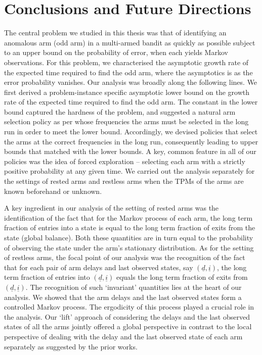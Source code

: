 \chapter{Conclusions and Future Directions}
\label{ch:conclusions_and_future_work}

The central problem we studied in this thesis was that of identifying an anomalous arm (odd arm) in a multi-armed bandit as quickly as possible subject to an upper bound on the probability of error, when each yields Markov observations. For this problem, we characterised the asymptotic growth rate of the expected time required to find the odd arm, where the asymptotics is as the error probability vanishes. Our analysis was broadly along the following lines. We first derived a problem-instance specific asymptotic lower bound on {\color{black} the growth rate of} the expected time required to find the odd arm. The constant in the lower bound captured the hardness of the problem, and suggested a natural arm selection policy as per whose frequencies the arms must be selected in the long run in order to meet the lower bound. Accordingly, we devised policies that select the arms at the correct frequencies in the long run, consequently leading to upper bounds that matched with the lower bounds. A key, common feature in all of our policies was the idea of forced exploration -- selecting each arm with a strictly positive probability at any given time. We carried out the analysis separately for the settings of rested arms and restless arms when the TPMs of the arms are known beforehand or unknown.

A key ingredient in our analysis of the setting of rested arms was the identification of the fact that for the Markov process of each arm, the long term fraction of entries into a state is equal to the long term fraction of exits from the state (global balance). Both these quantities are in turn equal to the probability of observing the state under the arm's stationary distribution. As for the setting of restless arms, the focal point of our analysis was the recognition of the fact that for each pair of arm delays and last observed states, say $(\underline{d}, \underline{i})$, the long term fraction of entries into $(\underline{d}, \underline{i})$ equals the long term fraction of exits from $(\underline{d}, \underline{i})$. The recognition of such `invariant' quantities lies at the heart of our analysis. We showed that the arm delays and the last observed states form a controlled Markov process. The ergodicity of this process played a crucial role in the analysis. Our `lift' approach of considering the delays and the last observed states of all the arms jointly offered a global perspective in contrast to the local perspective of dealing with the delay and the last observed state of each arm separately as suggested by the prior works.

